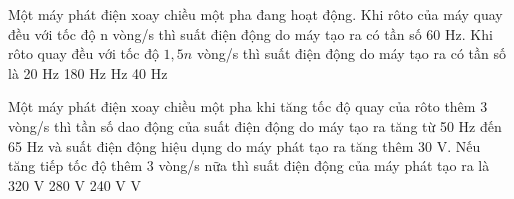 \begin{vidu}%
	 Một máy phát điện xoay chiều một  pha đang hoạt động. Khi rôto của máy quay đều với tốc độ n vòng/s thì suất điện động do máy tạo ra có tần số 60 Hz. Khi rôto quay đều với tốc độ $1,5n$ vòng/s thì suất điện động do máy tạo ra có tần số là 
	\choice
	{20 Hz}
	{180 Hz}
	{ Hz}
	{40 Hz}
	\loigiai{
\begin{itemize}
	\item 
	\item 
	\item 
\end{itemize}	
}	
\end{vidu}
\begin{vidu} %
	Một máy phát điện xoay chiều một pha khi tăng tốc độ quay của rôto thêm 3 vòng/s thì tần số dao động của suất điện động do máy tạo ra tăng từ 50 Hz đến 65 Hz và suất điện động hiệu dụng do máy phát tạo ra tăng thêm 30 V. Nếu tăng tiếp tốc độ thêm 3 vòng/s nữa thì suất điện động của máy phát tạo ra là
	\choice
	{320 V}
	{280 V}
	{240 V}
	{ V}
\end{vidu}

